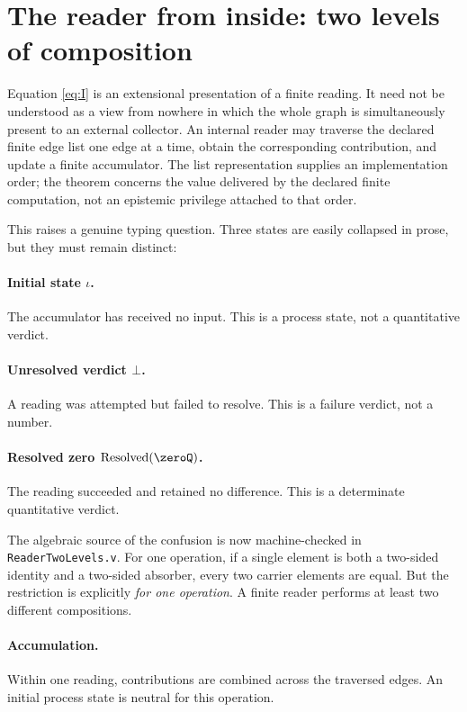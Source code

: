 \section{The reader from inside: two levels of composition}\label{sec:two-levels}

Equation \eqref{eq:I} is an extensional presentation of a finite reading. It need not be understood as a view from nowhere in which the whole graph is simultaneously present to an external collector. An internal reader may traverse the declared finite edge list one edge at a time, obtain the corresponding contribution, and update a finite accumulator. The list representation supplies an implementation order; the theorem concerns the value delivered by the declared finite computation, not an epistemic privilege attached to that order.

This raises a genuine typing question. Three states are easily collapsed in prose, but they must remain distinct:

\paragraph{Initial state $\iota$.} The accumulator has received no input. This is a process state, not a quantitative verdict.

\paragraph{Unresolved verdict $\bot$.} A reading was attempted but failed to resolve. This is a failure verdict, not a number.

\paragraph{Resolved zero $\mathrm{Resolved}(\zeroQ)$.} The reading succeeded and retained no difference. This is a determinate quantitative verdict.

The algebraic source of the confusion is now machine-checked in \verb|ReaderTwoLevels.v|. For one operation, if a single element is both a two-sided identity and a two-sided absorber, every two carrier elements are equal. But the restriction is explicitly \emph{for one operation}. A finite reader performs at least two different compositions.

\paragraph{Accumulation.} Within one reading, contributions are combined across the traversed edges. An initial process state is neutral for this operation.

